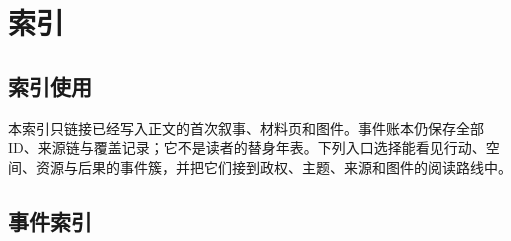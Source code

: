 \chapter{索引}
\label{app:index}

\section*{索引使用}
\label{app:index-guide}

本索引只链接已经写入正文的首次叙事、材料页和图件。事件账本仍保存全部 ID、来源链与覆盖记录；它不是读者的替身年表。下列入口选择能看见行动、空间、资源与后果的事件簇，并把它们接到政权、主题、来源和图件的阅读路线中。

\section*{事件索引}
\label{app:event-index}

